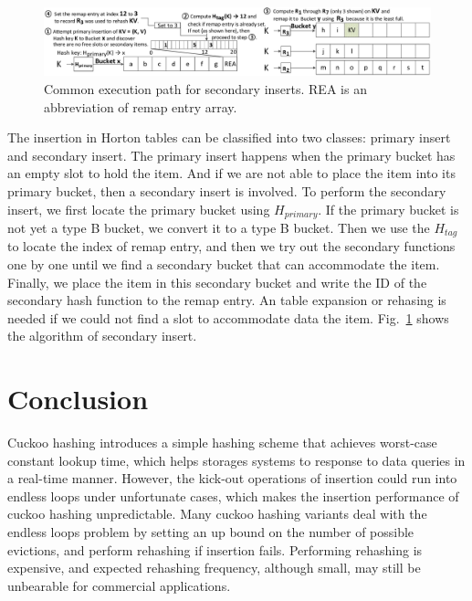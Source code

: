 \documentclass[12pt,conference,compsoc]{IEEEtran}
\begin{document}
\begin{figure}
    \centering
    \includegraphics[width=\textwidth]{Horton-insert.png}
    \caption{Common execution path for secondary inserts. REA is an abbreviation of remap entry array.} \label{fig:Horton-insert}
\end{figure}

The insertion in Horton tables can be classified into two classes: primary insert and secondary insert. The primary insert happens when the primary bucket has an empty slot to hold the item. And if we are not able to place the item into its primary bucket, then a secondary insert is involved. To perform the secondary insert, we first locate the primary bucket using $H_{primary}$. If the primary bucket is not yet a type B bucket, we convert it to a type B bucket. Then we use the $H_{tag}$ to locate the index of remap entry, and then we try out the secondary functions one by one until we find a secondary bucket that can accommodate the item. Finally, we place the item in this secondary bucket and write the ID of the secondary hash function to the remap entry. An table expansion or rehasing is needed if we could not find a slot to accommodate data the item. Fig.~\ref{fig:Horton-insert} shows the algorithm of secondary insert.

\section{Conclusion}
\label{sec:conclude}
Cuckoo hashing introduces a simple hashing scheme that achieves worst-case constant lookup time, which helps storages systems to response to data queries in a real-time manner. However, the kick-out operations of insertion could run into endless loops under unfortunate cases, which makes the insertion performance of cuckoo hashing unpredictable. Many cuckoo hashing variants deal with the endless loops problem by setting an up bound on the number of possible evictions, and perform rehashing if insertion fails. Performing rehashing is expensive, and expected rehashing frequency, although small, may still be unbearable for commercial applications. 
\end{document}
